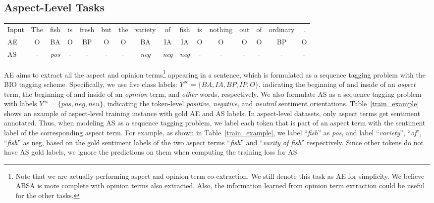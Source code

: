 \documentclass[11pt,a4paper]{article}
\begin{document}
\subsection{Aspect-Level Tasks}

\begin{table*}[t!]
\centering
\small
\begin{tabular}{lccccccccccccccc}
\toprule 
Input &The &fish &is &fresh &but &the &variety &of &fish &is &nothing &out &of &ordinary &.\\
AE &O &BA &O &BP &O &O &BA &IA &IA &O &O &O &O &BP &O\\
AS &- &\emph{pos} &- &- &- &- &\emph{neg} &\emph{neg} &\emph{neg} &- &- &- &- &- &-\\
\bottomrule
\end{tabular}
\caption{An aspect-level training instance with gold AE and AS labels.}\label{train_example}
\end{table*}

AE aims to extract all the aspect and opinion terms\footnote{Note that we are actually performing aspect and opinion term co-extraction. We still denote this task as AE for simplicity. 
We believe ABSA is more complete with opinion terms also extracted. Also, the information learned from opinion term extraction could be useful for the other tasks.} 
appearing in a sentence, which is formulated as a sequence tagging problem with the BIO tagging scheme. Specifically, we use five class labels: $Y^{ae} = \{BA, IA, BP, IP, O\}$, indicating the beginning of and inside of an \emph{aspect} term, the beginning of and inside of an \emph{opinion} term, and \emph{other} words, respectively. We also formulate AS as a sequence tagging problem with labels $Y^{as} = \{pos, neg, neu\}$, indicating the token-level \emph{positive}, \emph{negative}, and \emph{neutral} sentiment orientations. Table~\ref{train_example} shows an example of aspect-level training instance with gold AE and AS labels. In aspect-level datasets, only aspect terms get sentiment annotated. Thus, when modeling AS as a sequence tagging problem, we label each token that is part of an aspect term with the sentiment label of the corresponding aspect term. For example, as shown in Table~\ref{train_example}, we label ``\emph{fish}'' as \emph{pos}, and label ``\emph{variety}'', ``\emph{of}'', ``\emph{fish}'' as neg, based on the gold sentiment labels of the two aspect terms ``\emph{fish}'' and ``\emph{varity of fish}'' respectively. Since other tokens do not have AS gold labels, we ignore the predictions on them when computing the training loss for AS.
\end{document}
